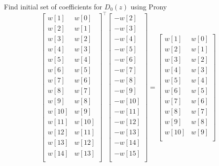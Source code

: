\documentclass[10pt]{amsart}
\begin{document}
  Find initial set of coefficients for $D_0(z)$ using Prony\;
\[
\begin{bmatrix}
   w[ 1] & w[ 0]   \\
   w[ 2] & w[ 1]   \\
   w[ 3] & w[ 2]   \\
   w[ 4] & w[ 3]   \\
   w[ 5] & w[ 4]   \\
   w[ 6] & w[ 5]   \\
   w[ 7] & w[ 6]   \\
   w[ 8] & w[ 7]   \\
   w[ 9] & w[ 8]   \\
   w[10] & w[ 9]   \\
   w[11] & w[10]   \\
   w[12] & w[11]   \\
   w[13] & w[12]   \\
   w[14] & w[13]   \\
\end{bmatrix}^\top
\begin{bmatrix}
 -  w[ 2]   \\
 -  w[ 3]   \\
 -  w[ 4]   \\
 -  w[ 5]   \\
 -  w[ 6]   \\
 -  w[ 7]   \\
 -  w[ 8]   \\
 -  w[ 9]   \\
 -  w[10]   \\
 -  w[11]   \\
 -  w[12]   \\
 -  w[13]   \\
 -  w[14]   \\
 -  w[15]   \\
\end{bmatrix}
  = 
\begin{bmatrix}
   w[ 1] & w[ 0]   \\
   w[ 2] & w[ 1]   \\
   w[ 3] & w[ 2]   \\
   w[ 4] & w[ 3]   \\
   w[ 5] & w[ 4]   \\
   w[ 6] & w[ 5]   \\
   w[ 7] & w[ 6]   \\
   w[ 8] & w[ 7]   \\
   w[ 9] & w[ 8]   \\
   w[10] & w[ 9]   \\

\end{bmatrix}\]
\end{document}
